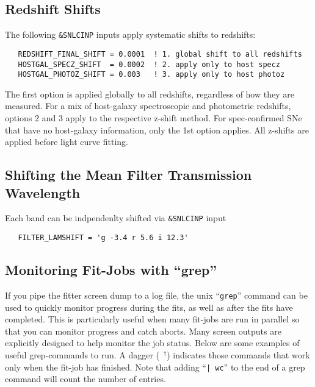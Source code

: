 \documentclass[12pt]{article}
\newcommand{\jobend}{\mbox{~$^\dagger$}}
\begin{document}
   \subsection{Redshift Shifts}
   \label{subsec:zshift}

The following {\tt \&SNLCINP} inputs apply systematic shifts to redshifts:
%
\begin{verbatim}
   REDSHIFT_FINAL_SHIFT = 0.0001  ! 1. global shift to all redshifts
   HOSTGAL_SPECZ_SHIFT  = 0.0002  ! 2. apply only to host specz
   HOSTGAL_PHOTOZ_SHIFT = 0.003   ! 3. apply only to host photoz
\end{verbatim}
%
The first option is applied globally to all redshifts, regardless
of how they are measured.
For a mix of host-galaxy spectroscopic and photometric redshifts,
options 2 and 3 apply to the respective z-shift method.
For spec-confirmed SNe that have no host-galaxy information,
only the 1st option applies.
All z-shifts are applied before light curve fitting.


   \subsection{Shifting the Mean Filter Transmission Wavelength}
   \label{subsec:lamshift}

Each band can be indpendenlty shifted via {\tt \&SNLCINP} input
%
\begin{verbatim}
   FILTER_LAMSHIFT = 'g -3.4 r 5.6 i 12.3'
\end{verbatim}

   \subsection{Monitoring Fit-Jobs with ``grep'' }
   \label{subsec:grep}

If you pipe the fitter screen dump to a log file,
the unix ``{\tt grep}'' command can be used
to quickly monitor progress during the fits, as well
as after the fits have completed. This is particularly
useful when many fit-jobs are run in parallel
so that you can monitor progress and catch aborts.
Many screen outputs are explicitly designed 
to help monitor the job status. Below are some 
examples of useful grep-commands to run.
A dagger ({\jobend}) indicates those commands
that work only when the fit-job has finished. 
Note that adding  ``{\tt | wc}'' to the end of
a grep command will count the number of entries.
\end{document}
